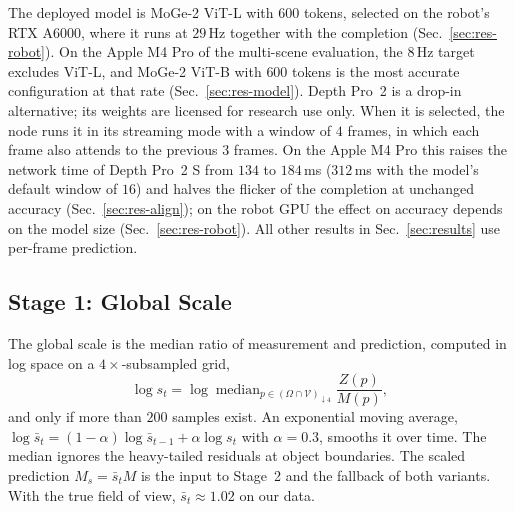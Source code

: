 \documentclass[conference]{IEEEtran}
\newcommand{\Dm}{Z}            %
\newcommand{\Dp}{M}            %
\newcommand{\Om}{\Omega}       %
\DeclareMathOperator*{\median}{median}
\begin{document}
The deployed model is MoGe-2 ViT-L with \(600\) tokens, selected on the
robot's RTX A6000, where it runs at \(29\,\)Hz together with the completion
(Sec.~\ref{sec:res-robot}). On the Apple M4 Pro of the multi-scene evaluation,
the \(8\,\)Hz target excludes ViT-L, and MoGe-2 ViT-B with \(600\) tokens is the
most accurate configuration at that rate (Sec.~\ref{sec:res-model}). Depth Pro~2 is a drop-in alternative; its
weights are licensed for research use only. When it is selected, the node runs it in its
streaming mode with a window of \(4\) frames, in which each frame also attends to the
previous \(3\) frames. On the Apple M4 Pro this raises the network time of Depth Pro~2 S
from \(134\) to \(184\,\)ms (\(312\,\)ms with the model's default window of \(16\)) and
halves the flicker of the completion at unchanged accuracy (Sec.~\ref{sec:res-align});
on the robot GPU the effect on accuracy depends on the model size (Sec.~\ref{sec:res-robot}). All other results in Sec.~\ref{sec:results} use per-frame
prediction.

\subsection{Stage 1: Global Scale}
\label{sec:global}
The global scale is the median ratio of measurement and prediction, computed
in log space on a \(4{\times}\)-subsampled grid,
\begin{equation}
  \log s_t = \log \median_{p\in(\Om\cap\mathcal{V})_{\downarrow 4}}
             \frac{\Dm(p)}{\Dp(p)},
  \label{eq:scale}
\end{equation}
and only if more than \(200\) samples exist. An exponential moving average,
\(\log \bar s_t=(1-\alpha)\log\bar s_{t-1}+\alpha\log s_t\) with
\(\alpha=0.3\), smooths it over time. The median ignores the heavy-tailed
residuals at object boundaries. The scaled prediction \(\Dp_s=\bar s_t\Dp\) is
the input to Stage~2 and the fallback of both variants. With the true field of
view, \(\bar s_t\approx1.02\) on our data.
\end{document}
